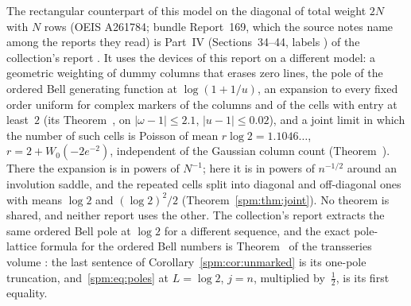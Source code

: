 \begin{writenote}
The rectangular counterpart of this model on the diagonal of total weight
$2N$ with $N$ rows (OEIS A261784; bundle Report~169, which the source notes
name among the reports they read) is Part~IV (Sections~34--44, labels
) of the collection's report
. It uses the devices of this report on a
different model: a geometric weighting of dummy columns that erases zero
lines, the pole of the ordered Bell generating function at $\log(1+1/u)$,
an expansion to every fixed order uniform for complex markers of the
columns and of the cells with entry at least~$2$ (its
Theorem~, on $|\omega-1|\le2.1$, $|u-1|\le0.02$),
and a joint limit in which the number of such cells is Poisson of mean
$r\log2=1.1046\ldots$, $r=2+W_0(-2e^{-2})$, independent of the Gaussian
column count (Theorem~). There the expansion is in
powers of $N^{-1}$; here it is in powers of $n^{-1/2}$ around an
involution saddle, and the repeated cells split into diagonal and
off-diagonal ones with means $\log2$ and $(\log2)^2/2$
(Theorem~\ref{spm:thm:joint}). No theorem is shared, and neither report
uses the other. The collection's report
 extracts the same ordered Bell pole
at $\log2$ for a different sequence, and the exact pole-lattice formula
for the ordered Bell numbers is Theorem~ of the
transseries volume
:
the last sentence of Corollary~\ref{spm:cor:unmarked} is its one-pole
truncation, and~\eqref{spm:eq:poles} at $L=\log2$, $j=n$, multiplied
by~$\tfrac12$, is its first equality.
\end{writenote}

